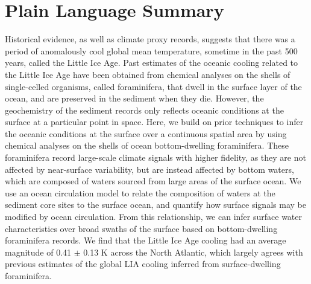 \documentclass[draft]{agujournal2019}
\begin{document}
\section*{Plain Language Summary}
Historical evidence, as well as climate proxy records, suggests that there was a period of anomalously cool global mean temperature, sometime in the past 500 years, called the Little Ice Age. Past estimates of the oceanic cooling related to the Little Ice Age have been obtained from chemical analyses on the shells of single-celled organisms, called foraminifera, that dwell in the surface layer of the ocean, and are preserved in the sediment when they die. However, the geochemistry of the sediment records only reflects oceanic conditions at the surface at a particular point in space. Here, we build on prior techniques to infer the oceanic conditions at the surface over a continuous spatial area by using chemical analyses on the shells of ocean bottom-dwelling foraminifera. These foraminifera record large-scale climate signals with higher fidelity, as they are not affected by near-surface variability, but are instead affected by bottom waters, which are composed of waters sourced from large areas of the surface ocean. We use an ocean circulation model to relate the composition of waters at the sediment core sites to the surface ocean, and quantify how surface signals may be modified by ocean circulation. From this relationship, we can infer surface water characteristics over broad swaths of the surface based on bottom-dwelling foraminifera records. We find that the Little Ice Age cooling had an average magnitude of 0.41 $\pm$ 0.13 K across the North Atlantic, which largely agrees with previous estimates of the global LIA cooling inferred from surface-dwelling foraminifera. 


%
%

\end{document}
